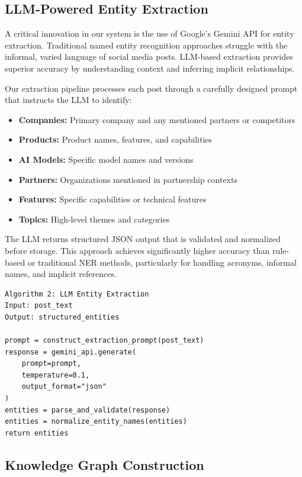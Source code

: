 \documentclass[11pt,twocolumn]{article}
\begin{document}
\subsection{LLM-Powered Entity Extraction}

A critical innovation in our system is the use of Google's Gemini API for entity extraction. Traditional named entity recognition approaches struggle with the informal, varied language of social media posts. LLM-based extraction provides superior accuracy by understanding context and inferring implicit relationships.

Our extraction pipeline processes each post through a carefully designed prompt that instructs the LLM to identify:

\begin{itemize}
\item \textbf{Companies:} Primary company and any mentioned partners or competitors
\item \textbf{Products:} Product names, features, and capabilities
\item \textbf{AI Models:} Specific model names and versions
\item \textbf{Partners:} Organizations mentioned in partnership contexts
\item \textbf{Features:} Specific capabilities or technical features
\item \textbf{Topics:} High-level themes and categories
\end{itemize}

The LLM returns structured JSON output that is validated and normalized before storage. This approach achieves significantly higher accuracy than rule-based or traditional NER methods, particularly for handling acronyms, informal names, and implicit references.

\begin{verbatim}
Algorithm 2: LLM Entity Extraction
Input: post_text
Output: structured_entities

prompt = construct_extraction_prompt(post_text)
response = gemini_api.generate(
    prompt=prompt,
    temperature=0.1,
    output_format="json"
)
entities = parse_and_validate(response)
entities = normalize_entity_names(entities)
return entities
\end{verbatim}

\subsection{Knowledge Graph Construction}
\end{document}
